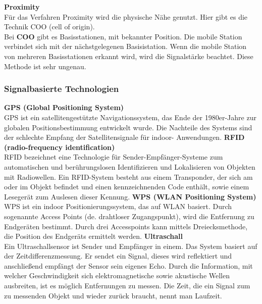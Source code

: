     \textbf{Proximity}\\
    Für das Verfahren Proximity wird die physische Nähe genutzt.
    Hier gibt es die Technik COO (cell of origin). \\
    Bei \textbf{COO} gibt es Basisstationen, mit bekannter Position. Die mobile Station verbindet sich mit der nächstgelegenen Basisistation. Wenn die mobile Station von mehreren Basisstationen erkannt wird, wird die Signalstärke beachtet. Diese Methode ist sehr ungenau.
    \\ %

    \subsubsection{Signalbasierte Technologien}
    \textbf{GPS (Global Positioning System)}\\
    GPS ist ein satellitengestützte Navigationssystem, das Ende der 1980er-Jahre zur globalen Positionsbestimmung entwickelt wurde. Die Nachteile des Systems sind der schlechte Empfang der Satellitensignale für indoor- Anwendungen.
    \textbf{RFID (radio-frequency identification)}\\
    RFID bezeichnet eine Technologie für Sender-Empfänger-Systeme zum automatischen und berührungslosen Identifizieren und Lokalisieren von Objekten mit Radiowellen. Ein RFID-System besteht aus einem Transponder, der sich am oder im Objekt befindet und einen kennzeichnenden Code enthält, sowie einem Lesegerät zum Auslesen dieser Kennung.
    \textbf{WPS (WLAN Positioning System)}\\
    WPS ist ein indoor Positionierungssystem, das auf WLAN basiert. Durch sogenannte  Access Points (de. drahtloser Zugangspunkt), wird die Entfernung zu Endgeräten bestimmt. Durch drei Accesspoints kann mittels Dreiecksmethode, die Position des Endgeräts ermittelt werden.
    \textbf{Ultraschall}\\
    Ein Ultraschallsensor ist Sender und Empfänger in einem. Das System basiert auf der Zeitdifferenzmessung. Er sendet ein Signal, dieses wird reflektiert und anschließend empfängt der Sensor sein eigenes Echo.
    Durch die Information, mit welcher Geschwindigkeit sich elektromagnetische sowie akustische Wellen ausbreiten, ist es möglich Entfernungen zu messen. Die Zeit, die ein Signal zum zu messenden Objekt und wieder zurück braucht, nennt man Laufzeit.

